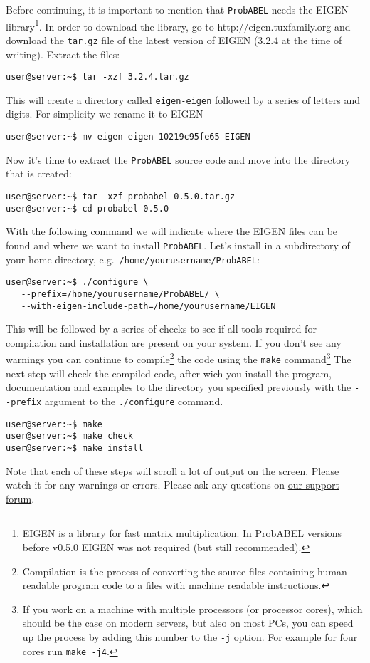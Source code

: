 \documentclass[12pt,a4paper]{article}
\newcommand{\PA}{\texttt{ProbABEL}}
\begin{document}
Before continuing, it is important to mention that \PA{} needs the
EIGEN library\footnote{EIGEN is a library for fast matrix
  multiplication. In ProbABEL versions before v0.5.0 EIGEN was not
  required (but still recommended).}. In order to download the
library, go to \url{http://eigen.tuxfamily.org} and download the
\texttt{tar.gz} file of the latest version of EIGEN (3.2.4 at the time
of writing). Extract the files:
\begin{lstlisting}[basicstyle=\footnotesize\ttfamily,]
user@server:~$ tar -xzf 3.2.4.tar.gz
\end{lstlisting}
This will create a directory called \texttt{eigen-eigen} followed by a
series of letters and digits. For simplicity we rename it to EIGEN
\begin{lstlisting}[basicstyle=\footnotesize\ttfamily,]
user@server:~$ mv eigen-eigen-10219c95fe65 EIGEN
\end{lstlisting}

Now it's time to extract the \PA{} source code and move into the
directory that is created:
\begin{lstlisting}[basicstyle=\footnotesize\ttfamily,]
user@server:~$ tar -xzf probabel-0.5.0.tar.gz
user@server:~$ cd probabel-0.5.0
\end{lstlisting}
With the following command we will indicate where the EIGEN files can
be found and where we want to install \PA{}. Let's install in a
subdirectory of your home directory,
e.g.~\texttt{/home/yourusername/ProbABEL}:
\begin{lstlisting}[basicstyle=\footnotesize\ttfamily,]
user@server:~$ ./configure \
   --prefix=/home/yourusername/ProbABEL/ \
   --with-eigen-include-path=/home/yourusername/EIGEN
\end{lstlisting}
This will be followed by a series of checks to see if all tools
required for compilation and installation are present on your
system. If you don't see any warnings you can continue to
compile\footnote{Compilation is the process of converting the source
  files containing human readable program code to a files with machine
  readable instructions.} the code using the \texttt{make}
command\footnote{If you work on a machine with multiple processors (or
  processor cores), which should be the case on modern servers, but
  also on most PCs, you can speed up the process by adding this number
  to the \texttt{-j} option. For example for four cores run
  \texttt{make -j4}.} The next step will check the compiled code,
after wich you install the program, documentation and examples to the
directory you specified previously with the \lstinline{--prefix} argument
to the \texttt{./configure} command.
\begin{lstlisting}[basicstyle=\footnotesize\ttfamily,]
user@server:~$ make
user@server:~$ make check
user@server:~$ make install
\end{lstlisting}
Note that each of these steps will scroll a lot of output on the
screen. Please watch it for any warnings or errors. Please ask any
questions on \href{http://forum.genabel.org/}{our support forum}.
\end{document}
